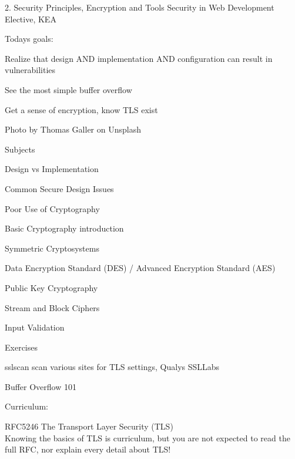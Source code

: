 \documentclass[Screen16to9,17pt]{foils}
\begin{document}
\mytitlepage
{2. Security Principles, Encryption and Tools}
{Security in Web Development Elective, KEA}



Todays goals:
\begin{list2}
\item Realize that design AND implementation AND configuration can result in vulnerabilities
\item See the most simple buffer overflow
\item Get a sense of encryption, know TLS exist
\end{list2}

  Photo by Thomas Galler on Unsplash



\begin{list1}
\item Subjects
\begin{list2}
\item Design vs Implementation
\item Common  Secure Design Issues
\item Poor Use of Cryptography
\item Basic Cryptography introduction
\item Symmetric Cryptosystems
\item Data Encryption Standard (DES) / Advanced Encryption Standard (AES)
\item Public Key Cryptography
\item Stream and Block Ciphers
\item Input Validation
\end{list2}
\item Exercises
\begin{list2}
\item sslscan scan various sites for TLS settings, Qualys SSLLabs
\item Buffer Overflow 101
\end{list2}
\end{list1}



Curriculum:
\begin{list1}
\item RFC5246 The Transport Layer Security (TLS) \\
Knowing the basics of TLS is curriculum, but you are not expected to read the full RFC, nor explain every detail about TLS!
\end{list1}
\end{document}

